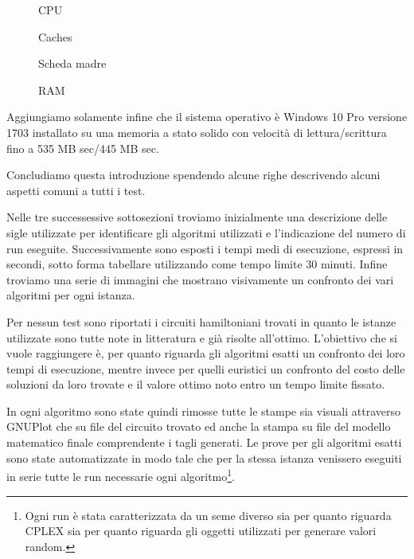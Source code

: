 \documentclass[11pt]{article}
\begin{document}
\begin{figure}[htbp]
    \centering
    \caption{CPU}
\end{figure}

\begin{figure}[htbp]
    \centering
    \caption{Caches}
\end{figure}

\begin{figure}[htbp]
    \centering
    \caption{Scheda madre}
\end{figure}

\begin{figure}[htbp]
    \centering
    \caption{RAM}
\end{figure}


Aggiungiamo solamente infine che il sistema operativo è Windows 10 Pro versione 1703 installato su una memoria a stato solido con velocità di lettura/scrittura fino a 535 MB sec/445 MB sec.

Concludiamo questa introduzione spendendo alcune righe descrivendo alcuni aspetti comuni a tutti i test.

Nelle tre successessive sottosezioni troviamo inizialmente una descrizione delle sigle utilizzate per identificare gli algoritmi utilizzati e l'indicazione del numero di run eseguite. Successivamente sono esposti i tempi medi di esecuzione, espressi in secondi, sotto forma tabellare utilizzando come tempo limite $30$ minuti. Infine troviamo una serie di immagini che mostrano visivamente un confronto dei vari algoritmi per ogni istanza.

Per nessun test sono riportati i circuiti hamiltoniani trovati in quanto le istanze utilizzate sono tutte note in litteratura e già risolte all'ottimo. L'obiettivo che si vuole raggiungere è, per quanto riguarda gli algoritmi esatti un confronto dei loro tempi di esecuzione, mentre invece per quelli euristici un confronto del costo delle soluzioni da loro trovate e il valore ottimo noto entro un tempo limite fissato.

In ogni algoritmo sono state quindi rimosse tutte le stampe sia visuali attraverso GNUPlot che su file del circuito trovato ed anche la stampa su file del modello matematico finale comprendente i tagli generati. Le prove per gli algoritmi esatti sono state automatizzate in modo tale che per la stessa istanza venissero eseguiti in serie tutte le run necessarie ogni algoritmo\footnote{Ogni run è stata caratterizzata da un seme diverso sia per quanto riguarda CPLEX sia per quanto riguarda gli oggetti utilizzati per generare valori random.}.
\end{document}
